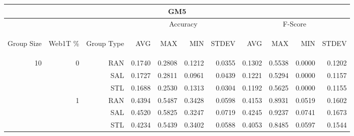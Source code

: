 \begin{center}
\begin{table}[htbp] 
 \begin{center}
\begin{tabular}{ | r | r | r | r | r | r | r | r | r | r | r |}
\hline
\multicolumn{11}{|c|}{GM5}\\
\hline
 & & & \multicolumn{4}{|c|}{Accuracy} & \multicolumn{4}{|c|}{F-Score}\\ \cline{4-11}
\begin{sideways}Group Size\end{sideways} & \begin{sideways}Web1T \%\end{sideways} & \begin{sideways}Group Type\end{sideways} & \begin{sideways}AVG\end{sideways} & \begin{sideways}MAX\end{sideways} & \begin{sideways}MIN\end{sideways} & \begin{sideways}STDEV\end{sideways} & \begin{sideways}AVG\end{sideways} & \begin{sideways}MAX\end{sideways} & \begin{sideways}MIN\end{sideways} & \begin{sideways}STDEV\end{sideways}\\
\hline
\multirow{18}{*}{10}
 & \multirow{3}{*}{0} & RAN & 0.1740 & 0.2808 & 0.1212 & 0.0355 & 0.1302 & 0.5538 & 0.0000 & 0.1202\\ \cline{3-11}
 &   & SAL & 0.1727 & 0.2811 & 0.0961 & 0.0439 & 0.1221 & 0.5294 & 0.0000 & 0.1157\\ \cline{3-11}
 &   & STL & 0.1688 & 0.2530 & 0.1313 & 0.0304 & 0.1192 & 0.5625 & 0.0000 & 0.1155\\ \cline{2-11}
 & \multirow{3}{*}{1} & RAN & 0.4394 & 0.5487 & 0.3428 & 0.0598 & 0.4153 & 0.8931 & 0.0519 & 0.1602\\ \cline{3-11}
 &   & SAL & 0.4520 & 0.5825 & 0.3247 & 0.0719 & 0.4245 & 0.9237 & 0.0741 & 0.1673\\ \cline{3-11}
 &   & STL & 0.4234 & 0.5439 & 0.3402 & 0.0588 & 0.4053 & 0.8485 & 0.0597 & 0.1544\\ \cline{2-11}

\end{tabular}
\end{center}
\end{table}
\end{center}
